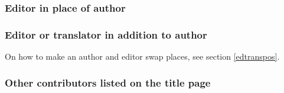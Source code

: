 \documentclass[11pt,letterpaper,oneside]{article}
\begin{document}
\begin{citebib}
\item \cite[79--80]{gawande2014}
\item \cite[191]{gawande2014}
\end{citebib}

\setcounter{subsubsection}{102}
\subsubsection{Editor in place of author}
\label{14.103}

\begin{citebib}
\item \cite[100]{egan2014}
\item \cite[33]{schechter2011}
\item \cite[34]{silverstein1974}
\item \cite[301--2]{egan2014}
\item \cite[54--56]{schechter2011}
\item \cite[38]{silverstein1974}
\end{citebib}

\subsubsection{Editor or translator in addition to author}
\label{14.104}

On how to make an author and editor swap places, see section
\ref{edtranspos}.

\begin{citebib}
\item \cite{bonnefoy1995}
\item \cite{menchu1999}
\item \cite{adorno1999}
\item \cite{pound1953}
\end{citebib}

\subsubsection{Other contributors listed on the title page}
\label{14.105}

\begin{citebib}
\item \cite{chaucer1966}
\item \cite{cullen1961}
\item \cite{hayek1994}
\item \cite{prather1998}
\item \cite{williams1990}
\end{citebib}
\end{document}
